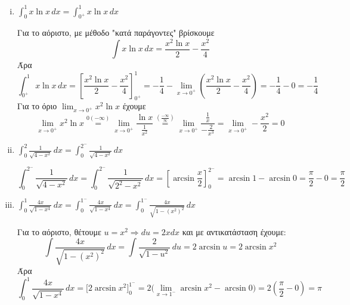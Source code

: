 \begin{enumerate}[i)]
  \item $ \boxed{\int _{0}^{1} x \ln{x} \,{dx}} = \int _{0^{+}}^{1} x \ln{x} \,{dx}  $
    \begin{solution}
      Για το αόριστο, με μέθοδο "κατά παράγοντες" βρίσκουμε
      \[
        \int x \ln{x} \,{dx} = \frac{x^{2} \ln{x}}{2} - \frac{x^{2}}{4}
      \] 
      Άρα
      \[
        \int _{0^{+}}^{1} x \ln{x} \,{dx} = \left[\frac{x^{2} \ln{x}}{2} -
          \frac{x^{2}}{4}\right]_{0^{+}}^{1} = -\frac{1}{4} - \lim_{x \to 0^{+}} \left(
        \frac{x^{2} \ln{x}}{2} - \frac{x^{2}}{4}\right) = - \frac{1}{4} - 0 = -
        \frac{1}{4}
      \] 
      Για το όριο $ \lim_{x \to 0^{+}} x^{2} \ln{x} $ έχουμε
      \[
        \lim_{x \to 0^{+}} x^{2} \ln{x} \overset{0 (- \infty)}{=} 
        \lim_{x \to 0^{+}} \frac{\ln{x}}{\frac{1}{x^{2}}} 
        \overset{(\frac{- \infty}{\infty})}{=}  
        \lim_{x \to 0^{+}} \frac{\frac{1}{x}}{-\frac{2}{x^{3}}} = \lim_{x \to 0^{+}} 
        - \frac{x^{2}}{2} = 0
      \] 
    \end{solution}

  \item $ \boxed{\int _{0}^{2} \frac{1}{\sqrt{4-x^{2}}} \,{dx}} = 
    \int _{0}^{2^{-}} \frac{1}{\sqrt{4-x^{2}}} \,{dx} $
    \begin{solution}
      \[
        \int _{0}^{2^{-}} \frac{1}{\sqrt{4-x^{2}}} \,{dx} = \int _{0}^{2^{-}}
        \frac{1}{\sqrt{2^{2}-x^{2}}}  \,{dx} = \left[\arcsin{\frac{x}{2}
      }\right]_{0}^{2^{-}} = \arcsin{1} - \arcsin{0} = \frac{\pi}{2} - 0 =
      \frac{\pi}{2}
      \]
    \end{solution}


  \item $ \boxed{\int _{0}^{1} \frac{4x}{\sqrt{1 - x^{4}}} \,{dx}} =  \int _{0}^{1^{-}}
    \frac{4x}{\sqrt{1 - x^{4}}} \,{dx} = \int _{0}^{1^{-}} \frac{4x}{\sqrt{1 -
      (x^{2})^{2}}} \,{dx} $ 
      \begin{solution}
        Για το αόριστο, θέτουμε $ u = x^{2} \Rightarrow du = 2x dx $
        και με αντικατάσταση έχουμε:
        \[
          \int \frac{4x}{\sqrt{1 -(x^{2})^{2}} } \,{dx} = \int \frac{2}{ \sqrt{1 -u^{2}}}
          \,{du} = 2 \arcsin{u} = 2 \arcsin{x^{2}}
        \] 
        Άρα
        \[
          \int _{0}^{1} \frac{4x}{\sqrt{1 - x^{4}}} \,{dx} = \bigl[2
          \arcsin{x^{2}}\bigr]_{0}^{1^{-}} = 2\bigl(\lim_{x \to 1^{-}} \arcsin{x^{2}} - \arcsin{0}\bigr)
          = 2\left( \frac{\pi}{2} - 0\right) = \pi
        \]
      \end{solution}
\end{enumerate}




